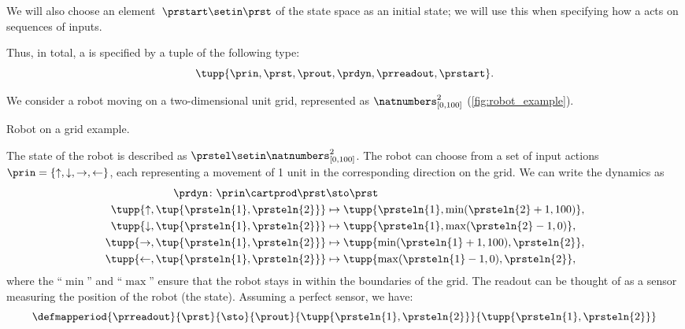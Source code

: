 We will also choose an element~$\prstart \setin \prst$ of the state space as an initial state; we will use this when specifying how a  acts on sequences of inputs.

Thus, in total, a  is specified by a tuple of the following type:
\begin{equation}
    \label{eq:moore-tuple}
    \tupp{\prin,\prst,\prout,\prdyn,\prreadout,\prstart}.
\end{equation}

\begin{example}
We consider a robot moving on a two-dimensional unit grid, represented as $\natnumbers^2_{[0,100]}$ (\cref{fig:robot_example}).
\begin{marginfigure}
    \centering
    \caption{Robot on a grid example. }
    \label{fig:robot_example}
\end{marginfigure}

The state of the robot is described as $\prstel \setin \natnumbers^2_{[0,100]}$.
The robot can choose from a set of input actions $\prin=\{\uparrow, \downarrow,\rightarrow,\leftarrow\}$, each representing a movement of 1 unit in the corresponding direction on the grid.
We can write the dynamics as
\begin{equation}
\begin{aligned}
    \prdyn\colon \prin \cartprod \prst &\sto \prst\\
    \tupp{\uparrow, \tup{\prsteln{1},\prsteln{2}}}&\mapsto \tupp{\prsteln{1}, \min(\prsteln{2}+1,100)},\\
    \tupp{\downarrow, \tup{\prsteln{1},\prsteln{2}}}&\mapsto \tupp{\prsteln{1}, \max(\prsteln{2}-1,0)},\\
    \tupp{\rightarrow, \tup{\prsteln{1},\prsteln{2}}}&\mapsto \tupp{\min(\prsteln{1}+1,100), \prsteln{2}},\\
    \tupp{\leftarrow, \tup{\prsteln{1},\prsteln{2}}}&\mapsto \tupp{\max(\prsteln{1}-1,0), \prsteln{2}},\\
\end{aligned}
\end{equation}
where the ``$\min$'' and ``$\max$'' ensure that the robot stays in within the boundaries of the grid.
The readout can be thought of as a sensor measuring the position of the robot (the state).
Assuming a perfect sensor, we have:
\begin{equation*}
\defmapperiod{\prreadout}
{\prst}
{\sto}
{\prout}
{\tupp{\prsteln{1},\prsteln{2}}}
{\tupp{\prsteln{1},\prsteln{2}}}
\end{equation*}
\end{example}

